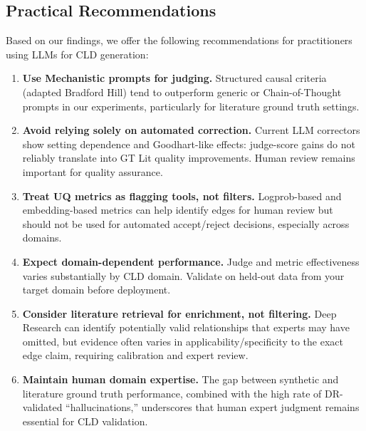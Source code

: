 \subsection{Practical Recommendations}
\label{sec:discussion_recommendations}

Based on our findings, we offer the following recommendations for practitioners using LLMs for CLD generation:

\begin{enumerate}
    \item \textbf{Use Mechanistic prompts for judging.} Structured causal criteria (adapted Bradford Hill) tend to outperform generic or Chain-of-Thought prompts in our experiments, particularly for literature ground truth settings.
    
    \item \textbf{Avoid relying solely on automated correction.} Current LLM correctors show setting dependence and Goodhart-like effects: judge-score gains do not reliably translate into GT Lit quality improvements. Human review remains important for quality assurance.
    
    \item \textbf{Treat UQ metrics as flagging tools, not filters.} Logprob-based and embedding-based metrics can help identify edges for human review but should not be used for automated accept/reject decisions, especially across domains.
    
    \item \textbf{Expect domain-dependent performance.} Judge and metric effectiveness varies substantially by CLD domain. Validate on held-out data from your target domain before deployment.
    
    \item \textbf{Consider literature retrieval for enrichment, not filtering.} Deep Research can identify potentially valid relationships that experts may have omitted, but evidence often varies in applicability/specificity to the exact edge claim, requiring calibration and expert review.
    
    \item \textbf{Maintain human domain expertise.} The gap between synthetic and literature ground truth performance, combined with the high rate of DR-validated ``hallucinations,'' underscores that human expert judgment remains essential for CLD validation.
\end{enumerate}

